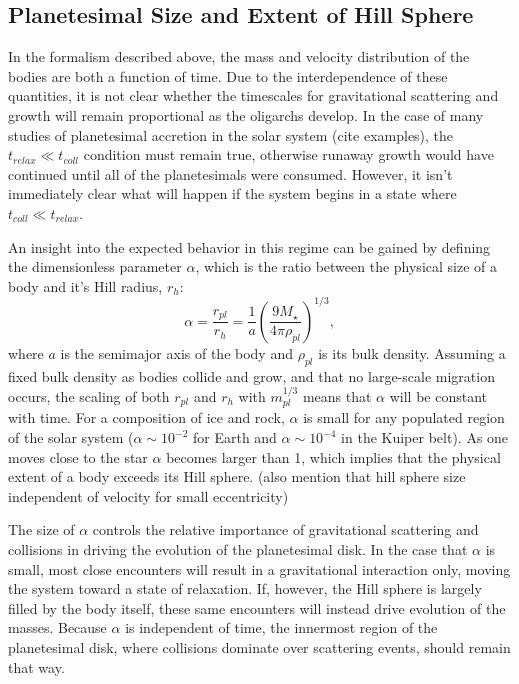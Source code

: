 \documentclass[twocolumn]{aastex63}
\begin{document}
\subsection{Planetesimal Size and Extent of Hill Sphere}\label{sec:sizeandhill}

In the formalism described above, the mass and velocity distribution of the bodies are both a function of time. Due to the interdependence of these quantities, it is not clear whether the timescales for gravitational scattering and growth will remain proportional as the oligarchs develop. In the case of many studies of planetesimal accretion in the solar system (cite examples), the $t_{relax} \ll t_{coll}$ condition must remain true, otherwise runaway growth would have continued until all of the planetesimals were consumed. However, it isn't immediately clear what will happen if the system begins in a state where $t_{coll} \ll t_{relax}$.

An insight into the expected behavior in this regime can be gained by
defining the dimensionless parameter $\alpha$, which is the ratio
between the physical size of a body and it's Hill radius, $r_{h}$:
\begin{equation}\label{eq:alpha}
	\alpha = \frac{r_{pl}}{r_{h}} = \frac{1}{a} \left( \frac{9 M_{\star}}{4 \pi \rho_{pl}} \right)^{1/3},
\end{equation}
where $a$ is the semimajor axis of the body and $\rho_{pl}$ is its bulk density. Assuming a fixed bulk density as bodies collide and grow, and that no large-scale migration occurs, the scaling of both $r_{pl}$ and $r_{h}$ with $m_{pl}^{1/3}$ means that $\alpha$ will be constant with time. For a composition of ice and rock, $\alpha$ is small for any populated region of the solar system ($\alpha \sim 10^{-2}$ for Earth and $\alpha \sim 10^{-4}$ in the Kuiper belt). As one moves close to the star $\alpha$ becomes larger than 1, which implies that the physical extent of a body exceeds its Hill sphere. (also mention that hill sphere size independent of velocity for small eccentricity)

The size of $\alpha$ controls the relative importance of gravitational scattering and collisions in driving the evolution of the planetesimal disk. In the case that $\alpha$ is small, most close encounters will result in a gravitational interaction only, moving the system toward a state of relaxation. If, however, the Hill sphere is largely filled by the body itself, these same encounters will instead drive evolution of the masses. Because $\alpha$ is independent of time, the innermost region of the planetesimal disk, where collisions dominate over scattering events, should remain that way.
\end{document}
